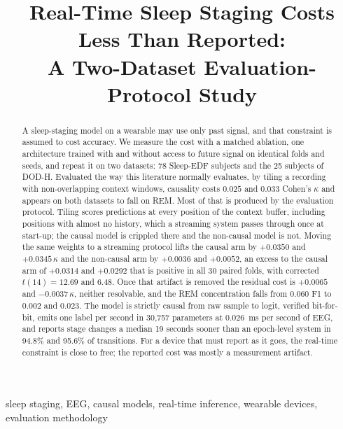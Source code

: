 \documentclass[conference]{IEEEtran}
\begin{document}
\title{Real-Time Sleep Staging Costs Less Than Reported:\\A Two-Dataset Evaluation-Protocol Study}

\author{
}

\maketitle

\begin{abstract}
A sleep-staging model on a wearable may use only past signal, and that constraint is assumed to
cost accuracy. We measure the cost with a matched ablation, one architecture trained with and
without access to future signal on identical folds and seeds, and repeat it on two datasets: 78
Sleep-EDF subjects and the 25 subjects of DOD-H. Evaluated the way this literature normally
evaluates, by tiling a recording with non-overlapping context windows, causality costs $0.025$
and $0.033$ Cohen's $\kappa$ and appears on both datasets to fall on REM. Most of that is
produced by the evaluation protocol. Tiling scores predictions at every position of the context
buffer, including positions with almost no history, which a streaming system passes through once
at start-up; the causal model is crippled there and the non-causal model is not. Moving the same
weights to a streaming protocol lifts the causal arm by $+0.0350$ and $+0.0345\,\kappa$ and the
non-causal arm by $+0.0036$ and $+0.0052$, an excess to the causal arm of $+0.0314$ and
$+0.0292$ that is positive in all 30 paired folds, with corrected $t(14) = 12.69$ and $6.48$. Once
that artifact is removed the residual cost is $+0.0065$ and $-0.0037\,\kappa$, neither resolvable,
and the REM concentration falls from $0.060$ F1 to $0.002$ and $0.023$. The model is strictly
causal from raw sample to logit, verified bit-for-bit, emits one label per second in 30{,}757
parameters at $0.026$~ms per second of EEG, and reports stage changes a median 19 seconds sooner
than an epoch-level system in 94.8\% and 95.6\% of transitions. For a device that must report as
it goes, the real-time constraint is close to free; the reported cost was mostly a measurement
artifact.
\end{abstract}

\begin{IEEEkeywords}
sleep staging, EEG, causal models, real-time inference, wearable devices, evaluation methodology
\end{IEEEkeywords}
\end{document}
